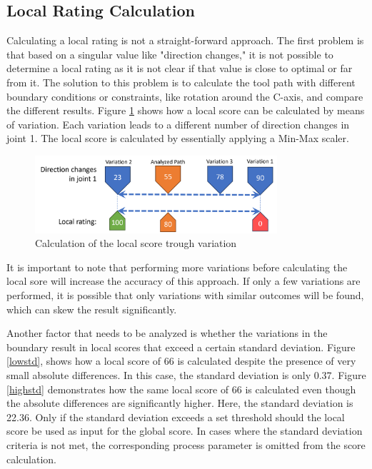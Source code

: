 \subsection{Local Rating Calculation}\label{LRC}
Calculating a local rating is not a straight-forward approach. The first problem is that based on a singular value like "direction changes," it is not possible to determine a local rating as it is not clear if that value is close to optimal or far from it.
The solution to this problem is to calculate the tool path with different boundary conditions or constraints, like rotation around the C-axis, and compare the different results.
Figure \ref{Localscore} shows how a local score can be calculated by means of variation. Each variation leads to a different number of direction changes in joint 1. The local score is calculated by essentially applying a Min-Max scaler.
\begin{figure}[H]
	\centerline{\includegraphics[width=0.8\textwidth]{figures/localscore.png}}
	\caption{Calculation of the local score trough variation}
	\label{Localscore}
\end{figure}

It is important to note that performing more variations before calculating the local sore will increase the accuracy of this approach. If only a few variations are performed, it is possible that only variations with similar outcomes will be found, which can skew the result significantly.

Another factor that needs to be analyzed is whether the variations in the boundary result in local scores that exceed a certain standard deviation. Figure \ref{lowstd}, shows how a local score of 66 is calculated despite the presence of very small absolute differences. In this case, the standard deviation is only 0.37. Figure \ref{highstd} demonstrates how the same local score of 66 is calculated even though the absolute differences are significantly higher. Here, the standard deviation is 22.36. Only if the standard deviation exceeds a set threshold should the local score be used as input for the global score. In cases where the standard deviation criteria is not met, the corresponding process parameter is omitted from the score calculation.

